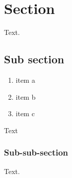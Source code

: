 \section{Section}
Text.

\subsection{Sub section}

\begin{enumerate}
    \item item a
    \item item b
    \item item c
\end{enumerate}

Text

\subsubsection{Sub-sub-section}
\label{label-1}

Text.

